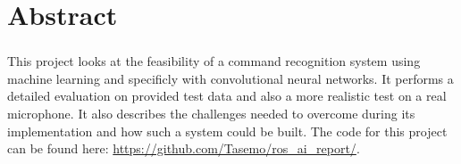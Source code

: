 \chapter*{Abstract} 
\subsection*{\thesistitle}

This project looks at the feasibility of a command recognition system using machine learning and specificly with convolutional neural networks. It 
performs a detailed evaluation on provided test data and also a more realistic test on a real microphone. It also describes the challenges needed
to overcome during its implementation and how such a system could be built. The code for this project can be found here: \url{https://github.com/Tasemo/ros_ai_report/}.
